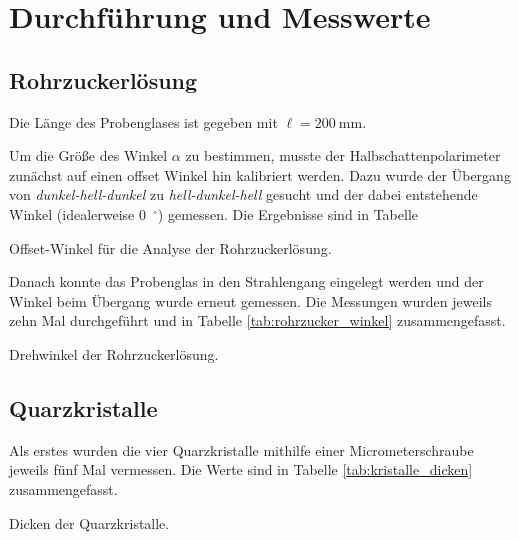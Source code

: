 \documentclass{article}
\begin{document}
\section{Durchführung und Messwerte}

\subsection{Rohrzuckerlösung}

Die Länge des Probenglases ist gegeben mit $\ell = 200~$mm.


Um die Größe des Winkel $\alpha$ zu bestimmen, musste der Halbschattenpolarimeter zunächst auf einen offset Winkel hin kalibriert werden. Dazu wurde der Übergang von \textit{dunkel-hell-dunkel} zu \textit{hell-dunkel-hell} gesucht und der dabei entstehende Winkel (idealerweise 0~$^\circ$) gemessen. Die Ergebnisse sind in Tabelle 


\begin{table}[H]
\caption{Offset-Winkel für die Analyse der Rohrzuckerlösung.}
\label{tab:rohrzucker_offset_winkel}
\centering

\end{table}



Danach konnte das Probenglas in den Strahlengang eingelegt werden und der Winkel beim Übergang wurde erneut gemessen. Die Messungen wurden jeweils zehn Mal durchgeführt und in Tabelle \ref{tab:rohrzucker_winkel} zusammengefasst.



\begin{table}[H]
\caption{Drehwinkel der Rohrzuckerlösung.}
\label{tab:rohrzucker_winkel}
\centering

\end{table}


\subsection{Quarzkristalle}

Als erstes wurden die vier Quarzkristalle mithilfe einer Micrometerschraube jeweils fünf Mal vermessen. Die Werte sind in Tabelle \ref{tab:kristalle_dicken} zusammengefasst.


\begin{table}[H]
\caption{Dicken der Quarzkristalle.}
\label{tab:kristalle_dicken}
\centering

\end{table}
\end{document}
